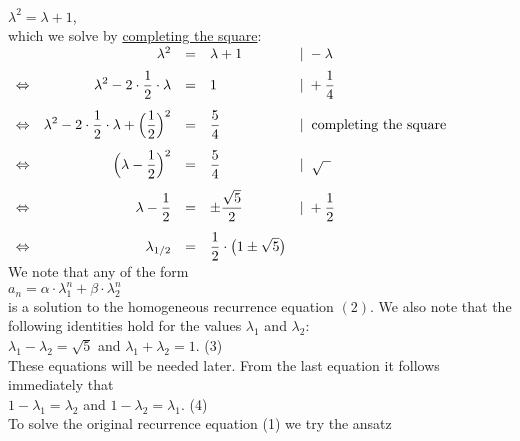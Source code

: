 \\[0.2cm]
\hspace*{1.3cm}
$\lambda^2 = \lambda + 1$,
\\[0.2cm]
which we solve by \href{https://en.wikipedia.org/wiki/Completing_the_square}{completing the square}:
\\[0.2cm]
\hspace*{1.3cm}
$\begin{array}{lrcll}
                &  \lambda^2 & = & \lambda + 1 & |\;- \lambda \\[0.2cm]
\Leftrightarrow & \displaystyle \lambda^2 - 2 \cdot \frac{1}{2} \cdot\lambda & = & 1 & |\;\displaystyle+ \frac{1}{4} \\[0.4cm]
\Leftrightarrow & \displaystyle \lambda^2 - 2 \cdot \frac{1}{2} \cdot\lambda + \Big(\frac{1}{2}\Big)^2 & = & \displaystyle\frac{5}{4}
                & | \;\; \mbox{completing the square}
                  \\[0.4cm]
\Leftrightarrow & \displaystyle \Big(\lambda -\frac{1}{2}\Big)^2 & = & \displaystyle\frac{5}{4}         & | \;\;\sqrt{\;\;} \\[0.4cm]
\Leftrightarrow & \displaystyle \lambda -\frac{1}{2} & = & \displaystyle\pm\frac{\sqrt{5}}{2} & | \displaystyle\;+ \frac{1}{2} \\[0.4cm]
\Leftrightarrow & \displaystyle \lambda_{1/2} & = & \displaystyle\frac{1}{2} \cdot \bigl(1 \pm \sqrt{5}\bigr) & 
 \end{array}
 $
\\[0.2cm]
We note that any  of the form
\\[0.2cm]
\hspace*{1.3cm}
$a_n = \alpha \cdot \lambda_1^n + \beta \cdot \lambda_2^n$
\\[0.2cm]
is a solution to the homogeneous recurrence equation $(2)$.
We also note that the following identities hold for the values $\lambda_1$ and $\lambda_2$:
\\[0.2cm]
\hspace*{1.3cm} 
$\lambda_1 - \lambda_2 = \sqrt{5}$ \quad and \quad $\lambda_1 + \lambda_2 = 1$. \hspace*{\fill} (3)
\\[0.2cm]
These equations will be needed later.
From the last equation it follows immediately that \\[0.2cm]
\hspace*{1.3cm} $1 - \lambda_1 = \lambda_2$ \quad and \quad $1 - \lambda_2 = \lambda_1$. \hspace*{\fill} (4)
\\[0.1cm]
To solve the original recurrence equation (1) we try the ansatz
